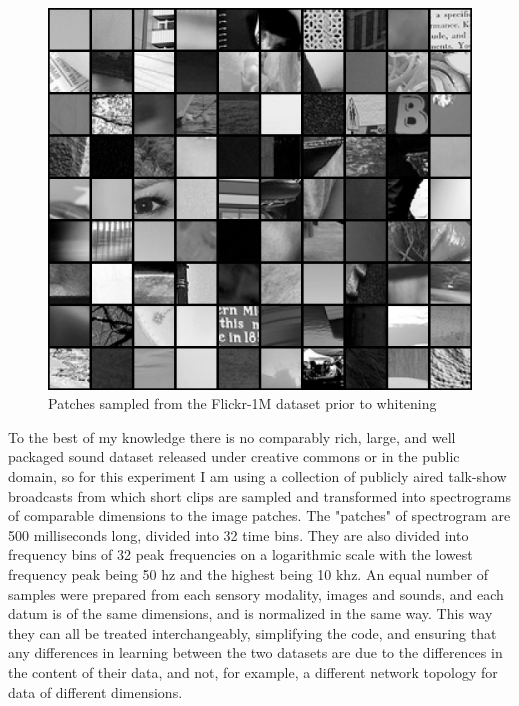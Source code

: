\documentclass[12pt]{article}
\begin{document}
\begin{doublespacing}
\begin{figure}[p]
\centering
\includegraphics[width=6in]{patch_arrangment}
\caption{Patches sampled from the Flickr-1M dataset prior to whitening}
\end{figure}
	
	To the best of my knowledge there is no comparably rich, large, and well packaged sound dataset released under creative commons or in the public domain, so for this experiment I am using a collection of publicly aired talk-show broadcasts from which short clips are sampled and transformed into spectrograms of comparable dimensions to the image patches. The "patches" of spectrogram are 500 milliseconds long, divided into 32 time bins. They are also divided into frequency bins of 32 peak frequencies on a logarithmic scale with the lowest frequency peak being 50 hz and the highest being 10 khz. An equal number of samples were prepared from each sensory modality, images and sounds, and each datum is of the same dimensions, and is normalized in the same way. This way they can all be treated interchangeably, simplifying the code, and ensuring that any differences in learning between the two datasets are due to the differences in the content of their data, and not, for example, a different network topology for data of different dimensions.
	

\end{doublespacing}
\end{document}
